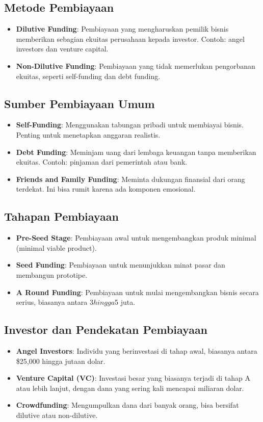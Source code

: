 \documentclass{article}
\begin{document}
\subsection{Metode Pembiayaan}
\begin{itemize}
    \item \textbf{Dilutive Funding}: Pembiayaan yang mengharuskan pemilik bisnis memberikan sebagian ekuitas perusahaan kepada investor. Contoh: angel investors dan venture capital.
    \item \textbf{Non-Dilutive Funding}: Pembiayaan yang tidak memerlukan pengorbanan ekuitas, seperti self-funding dan debt funding.
\end{itemize}

\subsection{Sumber Pembiayaan Umum}
\begin{itemize}
    \item \textbf{Self-Funding}: Menggunakan tabungan pribadi untuk membiayai bisnis. Penting untuk menetapkan anggaran realistis.
    \item \textbf{Debt Funding}: Meminjam uang dari lembaga keuangan tanpa memberikan ekuitas. Contoh: pinjaman dari pemerintah atau bank.
    \item \textbf{Friends and Family Funding}: Meminta dukungan finansial dari orang terdekat. Ini bisa rumit karena ada komponen emosional.
\end{itemize}

\subsection{Tahapan Pembiayaan}
\begin{itemize}
    \item \textbf{Pre-Seed Stage}: Pembiayaan awal untuk mengembangkan produk minimal (minimal viable product).
    \item \textbf{Seed Funding}: Pembiayaan untuk menunjukkan minat pasar dan membangun prototipe.
    \item \textbf{A Round Funding}: Pembiayaan untuk mulai mengembangkan bisnis secara serius, biasanya antara $3 hingga $5 juta.
\end{itemize}

\subsection{Investor dan Pendekatan Pembiayaan}
\begin{itemize}
    \item \textbf{Angel Investors}: Individu yang berinvestasi di tahap awal, biasanya antara \$25,000 hingga jutaan dolar.
    \item \textbf{Venture Capital (VC)}: Investasi besar yang biasanya terjadi di tahap A atau lebih lanjut, dengan dana yang sering kali mencapai miliaran dolar.
    \item \textbf{Crowdfunding}: Mengumpulkan dana dari banyak orang, bisa bersifat dilutive atau non-dilutive.
\end{itemize}
\end{document}
